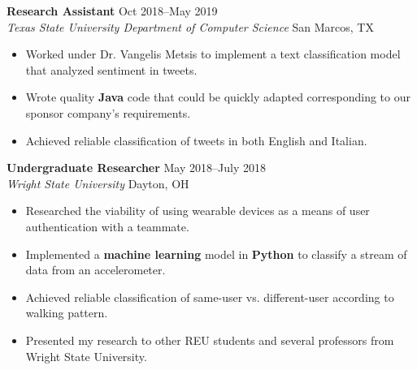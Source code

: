 \documentclass[10pt]{article}
\newcommand{\ressubheading}[4]{
    \textbf{#1} \hfill #2 \\[0pt]
    \textit{#3} \hfill #4 \\[0pt]
}
\newenvironment{resitemize}{
    \vspace{-6pt}
    \begin{itemize}
    \setlength\itemsep{-2pt}
}{
    \end{itemize}
}
\begin{document}
\begin{NoHyper}
\ressubheading
	{Research Assistant}
	{Oct 2018--May 2019}
	{Texas State University Department of Computer Science}
	{San Marcos, TX}
    \begin{resitemize}
    	\item Worked under Dr. Vangelis Metsis to implement a text classification model that analyzed sentiment in tweets.
    	\item Wrote quality \textbf{Java} code that could be quickly adapted corresponding to our sponsor company's requirements.
        \item Achieved reliable classification of tweets in both English and Italian.
    \end{resitemize}

\ressubheading
	{Undergraduate Researcher}
	{May 2018--July 2018}
	{Wright State University}
	{Dayton, OH}
    \begin{resitemize}
        \item Researched the viability of using wearable devices as a means of user authentication with a teammate.
        \item Implemented a \textbf{machine learning} model in \textbf{Python} to classify a stream of data from an accelerometer.
        \item Achieved reliable classification of same-user vs. different-user according to walking pattern.
        \item Presented my research to other REU students and several professors from Wright State University.
    \end{resitemize}

    

\end{NoHyper}
\end{document}
